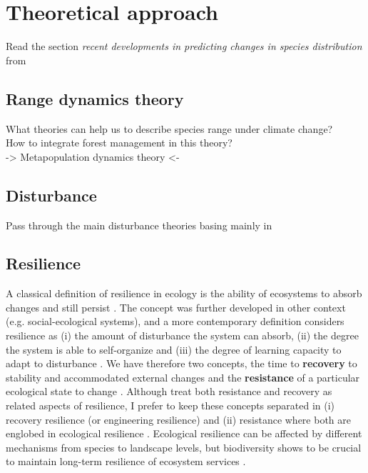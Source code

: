 \section{Theoretical approach}\label{ta}

Read the section \textit{recent developments in predicting changes in species distribution} from \citet{Ehrlen2015}

\subsection{Range dynamics theory}

What theories can help us to describe species range under climate change?\\
How to integrate forest management in this theory?\\
-> Metapopulation dynamics theory <-

\subsection{Disturbance}
Pass through the main disturbance theories basing mainly in \citet{Pulsford2016}

\subsection{Resilience}\label{res}

A classical definition of resilience in ecology is the ability of ecosystems to absorb changes and still persist \citep{Holling1973}.
The concept was further developed in other context (e.g. social-ecological systems), and a more contemporary definition considers resilience as (i) the amount of disturbance the system can absorb, (ii) the degree the system is able to self-organize and (iii) the degree of learning capacity to adapt to disturbance \citep{Cumming2011}.
We have therefore two concepts, the time to \textbf{recovery} to stability and accommodated external changes \citep{pimm1984,Folke2002} and the \textbf{resistance} of a particular ecological state to change \citep{Peterson1998}.
Although \citet{Oliver2015} treat both resistance and recovery as related aspects of resilience, I prefer to keep these concepts separated in (i) recovery resilience (or engineering resilience) and (ii) resistance where both are englobed in ecological resilience \citep{Hodgson2015,Nimmo2015}.
Ecological resilience can be affected by different mechanisms from species to landscape levels, but biodiversity shows to be crucial to maintain long-term resilience of ecosystem services \citep{Oliver2015}.


